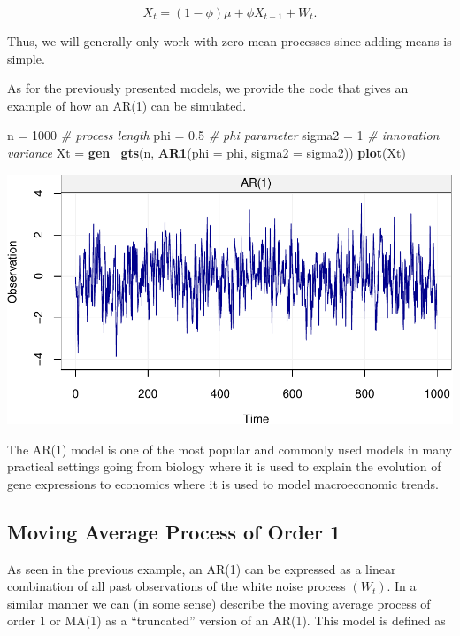 \documentclass[]{book}
\newenvironment{Shaded}{\begin{snugshade}}{\end{snugshade}}
\newcommand{\CommentTok}[1]{\textcolor[rgb]{0.56,0.35,0.01}{\textit{#1}}}
\newcommand{\DataTypeTok}[1]{\textcolor[rgb]{0.13,0.29,0.53}{#1}}
\newcommand{\DecValTok}[1]{\textcolor[rgb]{0.00,0.00,0.81}{#1}}
\newcommand{\FloatTok}[1]{\textcolor[rgb]{0.00,0.00,0.81}{#1}}
\newcommand{\KeywordTok}[1]{\textcolor[rgb]{0.13,0.29,0.53}{\textbf{#1}}}
\newcommand{\NormalTok}[1]{#1}
\newcommand{\StringTok}[1]{\textcolor[rgb]{0.31,0.60,0.02}{#1}}
\theoremstyle{definition}
\theoremstyle{definition}
\theoremstyle{definition}
\theoremstyle{remark}
\begin{document}
\[X_t = \left(1 - \phi \right) \mu + \phi X_{t-1} + W_t.\]

Thus, we will generally only work with zero mean processes since adding
means is simple.

As for the previously presented models, we provide the code that gives
an example of how an AR(1) can be simulated.

\begin{Shaded}
\begin{Highlighting}[]
\NormalTok{n =}\StringTok{ }\DecValTok{1000}                              \CommentTok{# process length}
\NormalTok{phi =}\StringTok{ }\FloatTok{0.5}                             \CommentTok{# phi parameter}
\NormalTok{sigma2 =}\StringTok{ }\DecValTok{1}                            \CommentTok{# innovation variance}
\NormalTok{Xt =}\StringTok{ }\KeywordTok{gen_gts}\NormalTok{(n, }\KeywordTok{AR1}\NormalTok{(}\DataTypeTok{phi =}\NormalTok{ phi, }\DataTypeTok{sigma2 =}\NormalTok{ sigma2))}
\KeywordTok{plot}\NormalTok{(Xt)}
\end{Highlighting}
\end{Shaded}

\includegraphics{ts_files/figure-latex/example_AR1-1.pdf}

The AR(1) model is one of the most popular and commonly used models in
many practical settings going from biology where it is used to explain
the evolution of gene expressions to economics where it is used to model
macroeconomic trends.

\hypertarget{ma1}{%
\subsection{Moving Average Process of Order 1}\label{ma1}}

As seen in the previous example, an AR(1) can be expressed as a linear
combination of all past observations of the white noise process
\((W_t)\). In a similar manner we can (in some sense) describe the
moving average process of order 1 or MA(1) as a ``truncated'' version of
an AR(1). This model is defined as
\end{document}

